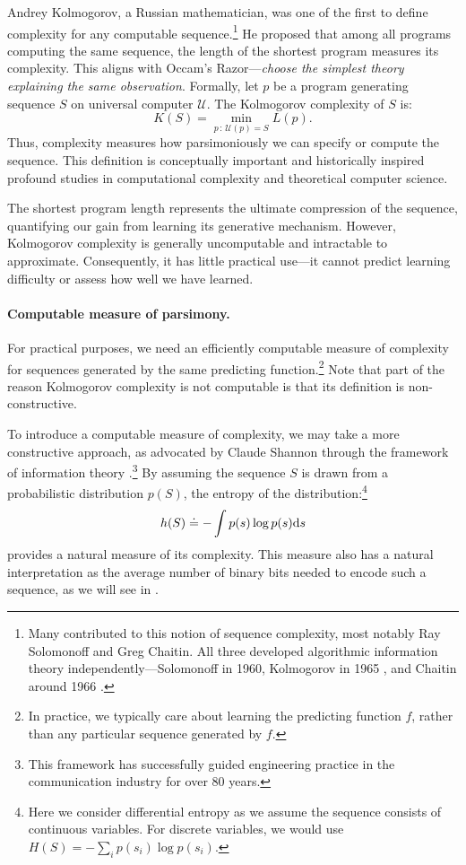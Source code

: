 \documentclass[../../book-main.tex]{subfiles}
\begin{document}
Andrey Kolmogorov, a Russian mathematician, was one of the first to define complexity for any computable sequence.\footnote{Many contributed to this notion of sequence complexity, most notably Ray Solomonoff and Greg Chaitin. All three developed algorithmic information theory independently---Solomonoff in 1960, Kolmogorov in 1965 \cite{Kolmogorov1998OnTO}, and Chaitin around 1966 \cite{Chaitin-1966}.} He proposed that among all programs computing the same sequence, the length of the shortest program measures its complexity. This aligns with Occam's Razor---\textit{choose the simplest theory explaining the same observation}. Formally, let $p$ be a program generating sequence $S$ on universal computer $\mathcal{U}$. The Kolmogorov complexity of $S$ is:
\begin{equation}
    K(S) = \min_{p\,:\, \mathcal{U}(p) = S} L(p). 
\end{equation}
Thus, complexity measures how parsimoniously we can specify or compute the sequence. This definition is conceptually important and historically inspired profound studies in computational complexity and theoretical computer science.

The shortest program length represents the ultimate compression of the sequence, quantifying our gain from learning its generative mechanism. However, Kolmogorov complexity is generally uncomputable \cite{Cover-Thomas} and intractable to approximate. Consequently, it has little practical use---it cannot predict learning difficulty or assess how well we have learned.


\paragraph{Computable measure of parsimony.}
For practical purposes, we need an efficiently computable measure of complexity for sequences generated by the same predicting function.\footnote{In practice, we typically care about learning the predicting function $f$, rather than any particular sequence generated by $f$.} Note that part of the reason Kolmogorov complexity is not computable is that its definition is non-constructive.

To introduce a computable measure of complexity, we may take a more constructive approach, as advocated by Claude Shannon through the framework of information theory \cite{Shannon-1948,Cover-Thomas}.\footnote{This framework has successfully guided engineering practice in the communication industry for over 80 years.} By assuming the sequence $S$ is drawn from a probabilistic distribution $p(S)$, the entropy of the distribution:\footnote{Here we consider differential entropy as we assume the sequence consists of continuous variables. For discrete variables, we would use $H(S) = - \sum_{i}p(s_i) \log p(s_i).$ }
\begin{equation}
    h(S) \doteq -\int p(s) \log p(s) \mathrm{d}s
    \label{eqn:entropy-definition}
\end{equation}
provides a natural measure of its complexity. This measure also has a natural interpretation as the average number of binary bits needed to encode such a sequence, as we will see in .
\end{document}

